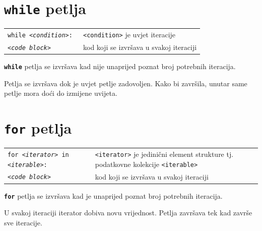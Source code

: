 \documentclass[10pt]{article}
\begin{document}
    \section*{\color{NavyBlue} \texttt{\textbf{while}} petlja}
    \begin{tabular}{|>{\tt}p{9.00cm}|>{}p{15.50cm}|}
        \hline
        while \textit{<condition>}:                         & \texttt{<condition>} je uvjet iteracije                                                               \\ 
        \hspace{5mm}\textit{<code block}>                   & kod koji se izvršava u svakoj iteraciji                                                               \\                             
        \hline
    \end{tabular}
    \begin{center}
        \footnotesize
        \texttt{\textbf{while}} petlja se izvršava kad nije unaprijed poznat broj potrebnih iteracija. 
    \end{center}
    \begin{center}
        \footnotesize
        Petlja se izvršava dok je uvjet petlje zadovoljen. Kako bi završila, unutar same petlje mora doći do izmijene uvijeta. 
    \end{center}

    \section*{\color{NavyBlue} \texttt{\textbf{for}} petlja}
    \begin{tabular}{|>{\tt}p{9.00cm}|>{}p{15.50cm}|}
        \hline
        for \textit{<iterator>} in \textit{<iterable>}:   & \texttt{<iterator>} je jedinični element strukture tj. podatkovne kolekcije \texttt{<iterable>}     \\ 
        \hspace{5mm}\textit{<code block}>                 & kod koji se izvršava u svakoj iteraciji                                                             \\                             
        \hline
    \end{tabular}
    \begin{center}
        \footnotesize
        \texttt{\textbf{for}} petlja se izvršava kad je unaprijed poznat broj potrebnih iteracija. 
    \end{center}
    \begin{center}
        \footnotesize
        U svakoj iteraciji iterator dobiva novu vrijednost. Petlja završava tek kad završe sve iteracije.
    \end{center}
\end{document}
